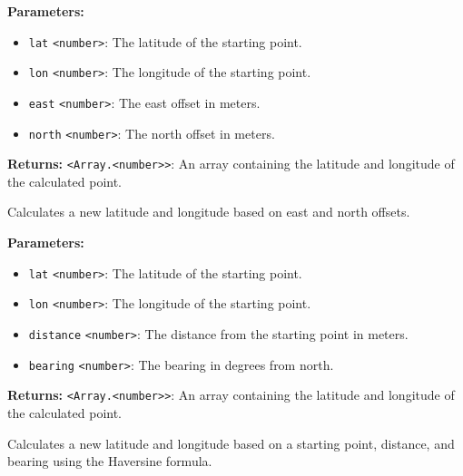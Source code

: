 \documentclass[12pt,a4paper]{article}
\begin{document}
\vspace{5mm}
\noindent {}


\noindent \textbf{Parameters:}
\begin{itemize}
  \item \texttt{lat} \texttt{<number>}: The latitude of the starting point.
  \item \texttt{lon} \texttt{<number>}: The longitude of the starting point.
  \item \texttt{east} \texttt{<number>}: The east offset in meters.
  \item \texttt{north} \texttt{<number>}: The north offset in meters.
\end{itemize}

\noindent \textbf{Returns:} \texttt{<Array.<number>>}: An array containing the latitude and longitude of the calculated point.

\noindent Calculates a new latitude and longitude based on east and north offsets.

\vspace{5mm}
\noindent {}


\noindent \textbf{Parameters:}
\begin{itemize}
  \item \texttt{lat} \texttt{<number>}: The latitude of the starting point.
  \item \texttt{lon} \texttt{<number>}: The longitude of the starting point.
  \item \texttt{distance} \texttt{<number>}: The distance from the starting point in meters.
  \item \texttt{bearing} \texttt{<number>}: The bearing in degrees from north.
\end{itemize}

\noindent \textbf{Returns:} \texttt{<Array.<number>>}: An array containing the latitude and longitude of the calculated point.

\noindent Calculates a new latitude and longitude based on a starting point, distance, and bearing using the Haversine formula.

\vspace{5mm}
\noindent {}
\end{document}
